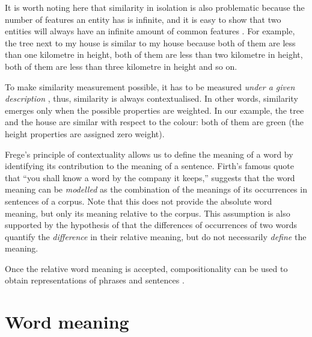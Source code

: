 It is worth noting here that similarity in isolation is also problematic because the number of features an entity has is infinite, and it is easy to show that two entities will always have an infinite amount of common features \cite{goodman1972problems,hahn1997concepts}. For example, the tree next to my house is similar to my house because both of them are less than one kilometre in height, both of them are less than two kilometre in height, both of them are less than three kilometre in height and so on. 

To make similarity measurement possible, it has to be measured \emph{under a given description} \cite{WCS:WCS1282,medin1993respects,Markman1996}, thus, similarity is always contextualised. In other words, similarity emerges only when the possible properties are weighted. In our example, the tree and the house are similar with respect to the colour: both of them are green (the height properties are assigned zero weight).

Frege's principle of contextuality allows us to define the meaning of a word by identifying its contribution to the meaning of a sentence. Firth's \citeyearpar{firth1957lingtheory} famous quote that ``you shall know a word by the company it keeps,'' suggests that the word meaning can be \emph{modelled} as the combination of the meanings of its occurrences in sentences of a corpus. Note that this does not provide the absolute word meaning, but only its meaning relative to the corpus. This assumption is also supported by the hypothesis of  that the differences of occurrences of two words quantify the \emph{difference} in their relative meaning, but do not necessarily \emph{define} the meaning.

Once the relative word meaning is accepted, compositionality can be used to obtain representations of phrases and sentences \cite{THEO:THEO373,Dowty1980,sep-montague-semantics,DBLP:journals/corr/abs-1003-4394,baroni2014frege}.

\section{Word meaning}
\label{sec:distr-hypoth}


